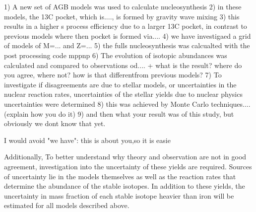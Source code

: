 1) A new set of AGB models was used to calculate nucleosynthesis
2) in these models, the 13C pocket, which is...., is formed by gravity wave mixing
3) this results in a higher s process efficiency due to a larger 13C pocket, in contrast to previous models where then pocket is formed via....
4) we have investigaed a grid of models of M=... and Z=...
5) the fulls nucleosynthesis was calcualted with the  post processing code mppnp
6) The evolution of isotopic abundances was calculated and compared to observations od.... + what is the result? where do you agree, where not? how is that differentfrom previous models?
7) To investigate if disagreements are due to stellar models, or uncertainties in the nuclear reaction rates, uncertainties of the stellar yields due to nuclear physics uncertainties were determined
8) this was achieved by Monte Carlo techniques.... (explain how you do it)
9) and then what your result was of this study, but obviously we dont know that yet.  

I would avoid "we have": this is about you,so it is easie



Additionally, To better understand why theory and observation are not in good agreement, investigation into the uncertainty of these yields are required. Sources of uncertainty lie in the models themselves as well as the reaction rates that determine the abundance of the stable isotopes. In addition to these yields, the uncertainty in mass fraction of each stable isotope heavier than iron will be estimated for all models described above.  
